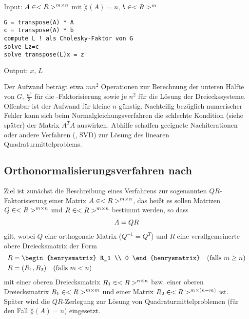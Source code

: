 \begin{algorithm}
	Input: $A\in<R>^{m\times n}$ mit $\rang(A)=n$, $b\in<R>^m$
	\begin{lstlisting}
G = transpose(A) * A
c = transpose(A) * b
compute L ! als Cholesky-Faktor von G
solve Lz=c
solve transpose(L)x = z
	\end{lstlisting}
	Output: $x$, $L$
\end{algorithm}

\begin{remark}
	Der Aufwand beträgt etwa $mn^2$ Operationen zur Berechnung der unteren Hälfte von $G$, $\frac{n^3}{3}$ für die -Faktorisierung sowie je $n^2$ für die Lösung der Dreieckssysteme. Offenbar ist der Aufwand für kleine $n$ günstig. Nachteilig bezüglich numerischer Fehler kann sich beim Normalgleichungsverfahren die schlechte Kondition (siehe später) der Matrix $A^TA$ auswirken. Abhilfe schaffen geeignete Nachiterationen oder andere Verfahren (, SVD) zur Lösung des linearen Quadraturmittelproblems.
\end{remark}

\subsection{Orthonormalisierungsverfahren nach }

Ziel ist zunächst die Beschreibung eines Verfahrens zur sogenannten $QR$-Faktorisierung einer Matrix $A\in<R>^{m\times n}$, das heißt es sollen Matrizen $Q\in<R>^{m\times n}$ und $R\in<R>^{m\times n}$ bestimmt werden, so dass
\begin{align}
	A = QR\notag
\end{align}
gilt, wobei $Q$ eine orthogonale Matrix ($Q^{-1}=Q^T$) und $R$ eine verallgemeinerte obere Dreiecksmatrix der Form
\begin{align}
	R &= \begin{henrysmatrix}
	R_1 \\ 0
	\end{henrysmatrix} \quad\text{(falls $m\ge n$)} \notag \\
	R &= (R_1,R_2) \quad\text{(falls $m < n$)} \notag
\end{align}
mit einer oberen Dreiecksmatrix $R_1\in<R>^{n\times n}$ bzw. einer oberen Dreiecksmatrix $R_1\in<R>^{m\times m}$ und einer Matrix $R_2\in<R>^{m\times (n-m)}$ ist. Später wird die $QR$-Zerlegung zur Lösung von Quadraturmittelproblemen (für den Fall $\rang(A)=n$) eingesetzt.

